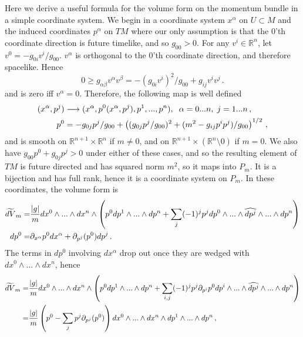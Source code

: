 Here we derive a useful formula for the volume form on the momentum bundle in a simple coordinate system. We begin in a coordinate system $x^\alpha$ on $U\subset M$ and the induced coordinates $p^\alpha$ on $TM$ where our only assumption is that the $0$'th coordinate direction is future timelike, and so $g_{00}>0$. For any $v^i\in \mathbb{R}^n$, let $v^0=-g_{0i}v^i/g_{00}$. $v^\alpha$ is orthogonal to the $0$'th coordinate direction, and therefore spacelike. Hence 
\begin{equation}
0\geq g_{\alpha \beta}v^\alpha v^\beta=-(g_{0i}v^i)^2/g_{00}+g_{ij}v^iv^j\,.
\end{equation}
and is zero iff $v^\alpha=0$. Therefore, the following map is well defined
\begin{align}
(x^\alpha,p^j)&\longrightarrow (x^\alpha,p^0(x^\alpha,p^j),p^1,...,p^n), \hspace{2mm} \alpha=0...n, \hspace{1mm} j=1...n \,,\notag\\
 p^0&=-g_{0j}p^j/g_{00}+\left((g_{0j}p^j/g_{00})^2+(m^2-g_{ij}p^ip^j)/g_{00}\right)^{1/2}\,,
\end{align}
and is smooth on $\mathbb{R}^{n+1}\times\mathbb{R}^n$ if $m\neq 0$, and on $\mathbb{R}^{n+1}\times\left(\mathbb{R}^n\setminus{0}\right)$ if $m=0$. We also have $g_{00}p^0+g_{0j}p^j>0$ under either of these cases, and so the resulting element of $TM$ is future directed and has squared norm $m^2$, so it maps into $P_m$. It is a bijection and has full rank, hence it is a coordinate system on $P_m$. In these coordinates, the volume form is
\begin{align}
\widetilde{dV}_m=&\frac{|g|}{m}dx^0\wedge...\wedge dx^n\wedge\left(p^0dp^1\wedge...\wedge dp^n+\sum_j (-1)^j p^j dp^0\wedge...\wedge\widehat{dp^j}\wedge...\wedge dp^n\right)\notag\\
dp^0=&\partial_{x^\alpha} p^0dx^\alpha+\partial_{p^j}(p^0) dp^j\,.
\end{align}
The terms in $dp^0$ involving $dx^\alpha$ drop out once they are wedged with $dx^0\wedge...\wedge dx^n$, hence
\begin{align}
\widetilde{dV}_m
=&\frac{|g|}{m}dx^0\wedge...\wedge dx^n\wedge\left(p^0dp^1\wedge...\wedge dp^n+\sum_{i,j} (-1)^j p^j \partial_{p^i}p^0 dp^i\wedge...\wedge\widehat{dp^j}\wedge...\wedge dp^n\right)\notag\\
=&\frac{|g|}{m}\left(p^0-\sum_{j}p^j \partial_{p^j}(p^0) \right)dx^0\wedge...\wedge dx^n\wedge dp^1\wedge...\wedge dp^n\,,
\end{align}

